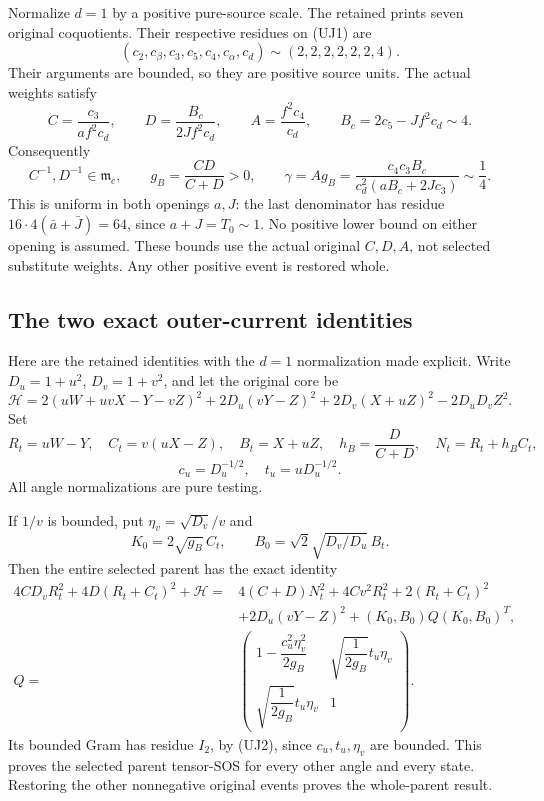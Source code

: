 Normalize $d=1$ by a positive pure-source scale. The retained
 prints seven original coquotients.
Their respective residues on (UJ1) are
\[
 (c_2,c_\beta,c_3,c_5,c_4,c_\alpha,c_d)
                    \sim(2,2,2,2,2,2,4).
\]
Their arguments are bounded, so they are positive source units.
The actual weights satisfy
\[
 C=\frac{c_3}{af^2c_d},\qquad
 D=\frac{B_c}{2Jf^2c_d},\qquad A=\frac{f^2c_4}{c_d},
 \qquad B_c=2c_5-Jf^2c_d\sim4.
\]
Consequently
\[
 C^{-1},D^{-1}\in\mathfrak m_c,\qquad
 g_B=\frac{CD}{C+D}>0,\qquad
 \gamma=A g_B=
 \frac{c_4c_3B_c}{c_d^2(aB_c+2Jc_3)}\sim\frac14.
                                                               \tag{UJ2}
\]
This is uniform in both openings $a,J$: the last denominator has
residue $16\cdot4(\bar a+\bar J)=64$, since $a+J=T_0\sim1$.
No positive lower bound on either opening is assumed.
These bounds use the actual original $C,D,A$, not selected
substitute weights. Any other positive event is restored whole.

\subsection{The two exact outer-current identities}

Here are the retained identities with the $d=1$ normalization made
explicit. Write $D_u=1+u^2$, $D_v=1+v^2$, and let the original core be
\[
 \mathcal H=
 2(uW+uvX-Y-vZ)^2+2D_u(vY-Z)^2
 +2D_v(X+uZ)^2-2D_uD_vZ^2.
\]
Set
\[
 R_t=uW-Y,\quad C_t=v(uX-Z),\quad B_t=X+uZ,
 \quad h_B=\frac D{C+D},\quad N_t=R_t+h_BC_t,
\]
\[
 c_u=D_u^{-1/2},\quad t_u=uD_u^{-1/2}.
\]
All angle normalizations are pure testing.

If $1/v$ is bounded, put $\eta_v=\sqrt{D_v}/v$ and
\[
 K_0=2\sqrt{g_B}\,C_t,\qquad
 B_0=\sqrt2\sqrt{D_v/D_u}\,B_t.
\]
Then the entire selected parent has the exact identity
\[
\begin{split}
 4CD_vR_t^2+4D(R_t+C_t)^2+\mathcal H
 ={}&4(C+D)N_t^2+4Cv^2R_t^2+2(R_t+C_t)^2\\
 &+2D_u(vY-Z)^2+(K_0,B_0)Q(K_0,B_0)^T,\\
 Q={}&
 \begin{pmatrix}
 1-\dfrac{c_u^2\eta_v^2}{2g_B}&
          \sqrt{\dfrac1{2g_B}}t_u\eta_v\\
 \sqrt{\dfrac1{2g_B}}t_u\eta_v&1
 \end{pmatrix}.
\end{split}                                                     \tag{UJ3}
\]
Its bounded Gram has residue $I_2$, by (UJ2), since
$c_u,t_u,\eta_v$ are bounded. This proves the selected parent
tensor-SOS for every other angle and every state. Restoring the
other nonnegative original events proves the whole-parent result.

